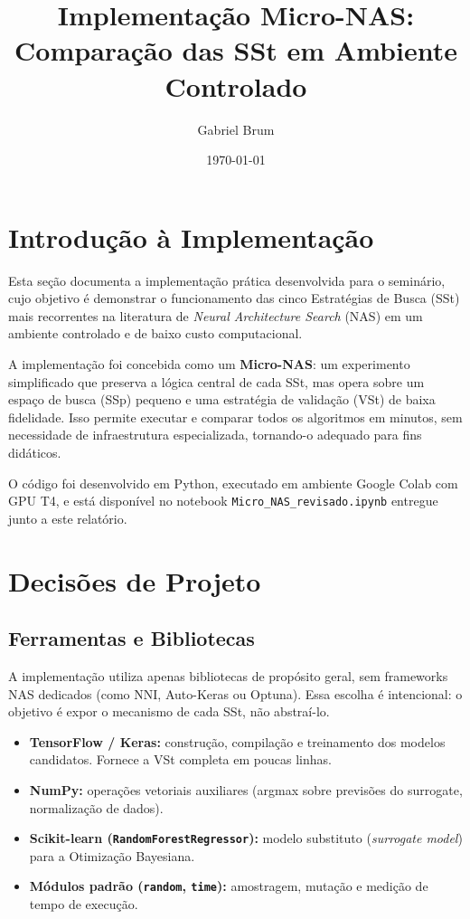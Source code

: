 \documentclass[a4paper,12pt]{article}
\title{\textbf{Implementação Micro-NAS:\\Comparação das SSt em Ambiente Controlado}}
\author{Gabriel Brum}
\date{\today}
\begin{document}
\maketitle
\tableofcontents
\newpage

\section{Introdução à Implementação}

Esta seção documenta a implementação prática desenvolvida para o seminário, cujo objetivo é demonstrar o funcionamento das cinco Estratégias de Busca (SSt) mais recorrentes na literatura de \textit{Neural Architecture Search} (NAS) em um ambiente controlado e de baixo custo computacional.

A implementação foi concebida como um \textbf{Micro-NAS}: um experimento simplificado que preserva a lógica central de cada SSt, mas opera sobre um espaço de busca (SSp) pequeno e uma estratégia de validação (VSt) de baixa fidelidade. Isso permite executar e comparar todos os algoritmos em minutos, sem necessidade de infraestrutura especializada, tornando-o adequado para fins didáticos.

O código foi desenvolvido em Python, executado em ambiente Google Colab com GPU T4, e está disponível no notebook \texttt{Micro\_NAS\_revisado.ipynb} entregue junto a este relatório.

\section{Decisões de Projeto}

\subsection{Ferramentas e Bibliotecas}

A implementação utiliza apenas bibliotecas de propósito geral, sem frameworks NAS dedicados (como NNI, Auto-Keras ou Optuna). Essa escolha é intencional: o objetivo é expor o mecanismo de cada SSt, não abstraí-lo.

\begin{itemize}[noitemsep]
    \item \textbf{TensorFlow / Keras:} construção, compilação e treinamento dos modelos candidatos. Fornece a VSt completa em poucas linhas.
    \item \textbf{NumPy:} operações vetoriais auxiliares (argmax sobre previsões do surrogate, normalização de dados).
    \item \textbf{Scikit-learn (\texttt{RandomForestRegressor}):} modelo substituto (\textit{surrogate model}) para a Otimização Bayesiana.
    \item \textbf{Módulos padrão (\texttt{random}, \texttt{time}):} amostragem, mutação e medição de tempo de execução.
\end{itemize}
\end{document}
